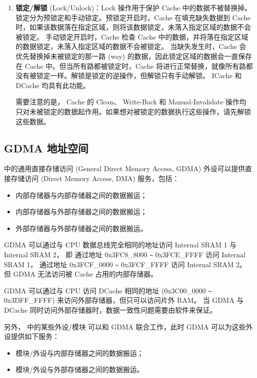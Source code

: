 \documentclass[main\_\_CN.tex]{subfiles}
\begin{document}
\begin{enumerate}
\item \textbf{锁定/解锁} (Lock/Unlock)：Lock 操作用于保护 Cache 中的数据不被替换掉。锁定分为预锁定和手动锁定。预锁定开启时，Cache 在填充缺失数据到 Cache 时，如果该数据落在指定区域，则将该数据锁定，未落入指定区域的数据不会被锁定。 手动锁定开启时，Cache 检查 Cache 中的数据，并将落在指定区域的数据锁定，未落入指定区域的数据不会被锁定。
当缺失发生时，Cache 会优先替换掉未被锁定的那一路 (way) 的数据，因此锁定区域的数据会一直保存在 Cache 中。但当所有路都被锁定时，Cache 将进行正常替换，就像所有路都没有被锁定一样。解锁是锁定的逆操作，但解锁只有手动解锁。
ICache 和 DCache 均具有此功能。

需要注意的是， Cache 的 Clean、 Write-Back 和 Manual-Invalidate 操作均只对未被锁定的数据起作用。如果想对被锁定的数据执行这些操作，请先解锁这些数据。
\end{enumerate}



\subsection{GDMA 地址空间}

\chipname{} 中的通用直接存储访问 (General Direct Memory Access, GDMA) 外设可以提供直接存储访问 (Direct Memory Access, DMA) 服务，包括：
\begin{itemize}
\item 内部存储器与内部存储器之间的数据搬运；
\item 内部存储器与外部存储器之间的数据搬运；
\item 外部存储器与外部存储器之间的数据搬运。
\end{itemize}

GDMA 可以通过与 CPU 数据总线完全相同的地址访问 Internal SRAM 1 与 Internal SRAM 2，
即 通过地址 0x{}3FC8\_8000 \verb+~+ 0x{}3FCE\_FFFF 访问 Internal SRAM 1，
通过地址 0x{}3FCF\_0000 \verb+~+ 0x{}3FCF\_FFFF 访问 Internal SRAM 2。
但 GDMA 无法访问被 Cache 占用的内部存储器。

GDMA 可以通过与 CPU 访问 DCache 相同的地址 (0x{}3C00\_0000 \verb+~+ 0x{}3DFF\_FFFF) 来访问外部存储器，但只可以访问片外 RAM。 当 GDMA 与 DCache 同时访问外部存储器时，数据一致性问题需要由软件来保证。

另外，\chipname{} 中的某些外设/模块 可以和 GDMA 联合工作，此时 GDMA 可以为这些外设提供如下服务：
\begin{itemize}
\item 模块/外设与内部存储器之间的数据搬运；
\item 模块/外设与外部存储器之间的数据搬运。
\end{itemize}
\end{document}
